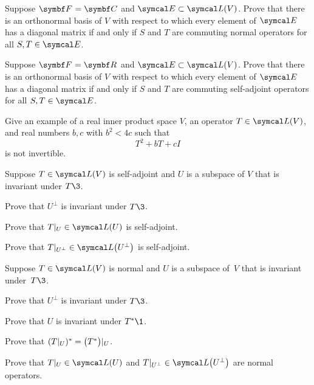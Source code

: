 \begin{exercises}
\exercise
Suppose $\F{} = \C{}$ and $\E \subset \L(V)$. Prove that there is an orthonormal basis of $V$ with respect to which every element of $\E$ has a diagonal matrix if and only if $S$ and $T$ are commuting normal operators for all $S, T \in \E$.%
 \label{5SimDiag}


\exercise
Suppose $\F{} = \R{}$ and $\E \subset \L(V)$. Prove that there is an orthonormal basis of $V$ with respect to which every element of $\E$ has a diagonal matrix if and only if $S$ and $T$ are commuting self-adjoint operators for all $S, T \in \E$.%
 \label{5SimDiagR}


\exercise
Give an example of a real inner product space $V$, an operator $T \in \L(V)$, and real numbers $b, c$ with $b^2 < 4 c$ such that
\[
T^2 + b T + c I
\]
is not invertible.


\exercise
Suppose $T \in \L(V)$ is self-adjoint and $U$ is a subspace of $V$ that is invariant under $T\3$.\label{sa210}
\begin{subtheorem}
\item
Prove that $U^\perp$ is invariant under\/ $T\3$.
\item
Prove that $T|_U \in \L(U)$ is self-adjoint.
\item
Prove that $T|_{U^\perp} \in \L\paren[\big]{U^\perp}$ is self-adjoint.
\end{subtheorem}
\exercisesubtheoremend


\exercise
Suppose $T \in \L(V)$ is normal and $U$ is a subspace of\/~$V$ that is invariant under\/~$T\3$.\label{7spectralalt}
\begin{subtheorem}
\item
Prove that $U^\perp$ is invariant under\/ $T\3$.
\item
Prove that $U$ is invariant under\/ $T^*\1$.
\item
Prove that $(T|_U)^* = \paren[\big]{T^*}|_U$.
\item
Prove that $T|_U \in \L(U)$ and $T|_{U^\perp} \in \L\paren[\big]{U^\perp}$ are normal operators.
\end{subtheorem}



\end{exercises}
